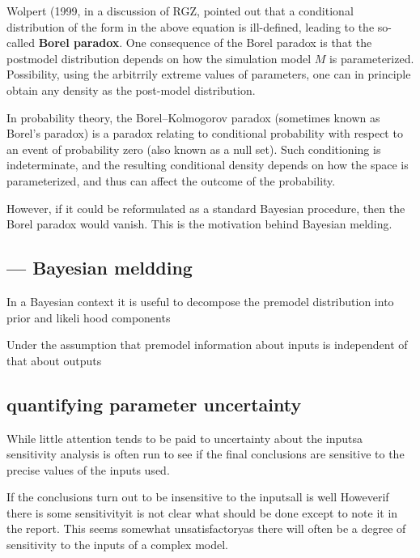 Wolpert (1999, in a discussion of RGZ, pointed out that a conditional
distribution of the form in the above equation is ill-defined, leading to the
so-called {\bf Borel paradox}.
One consequence of the Borel paradox is that the postmodel distribution depends
on how the simulation model $M$ is parameterized. Possibility, using the
arbitrrily extreme values of parameters, one can in principle obtain any density
as the post-model distribution.

\begin{mdframed}

In probability theory, the Borel–Kolmogorov paradox (sometimes known as Borel's
paradox) is a paradox relating to conditional probability with respect to an
event of probability zero (also known as a null set).
Such conditioning is indeterminate, and the resulting conditional density
depends on how the space is parameterized, and thus can affect the outcome of
the probability.

\end{mdframed}


However, if it could be reformulated as a standard Bayesian procedure, then the
Borel paradox would vanish. This is the motivation behind Bayesian melding.

\subsection{--- Bayesian meldding}

In a Bayesian context it is useful to decompose the premodel distribution into prior and likeli
hood components

Under the assumption that premodel information about inputs is independent
of that about outputs


\subsection{quantifying parameter uncertainty}

While little attention tends to be paid to uncertainty about the inputsa
sensitivity analysis is often run to see if the final conclusions are sensitive
to the precise values of the inputs used.

If the conclusions turn out to be insensitive to the inputsall is well
Howeverif there is some sensitivityit is not clear what should be done
except to note it in the report. This seems somewhat unsatisfactoryas there
will often be a degree of sensitivity to the inputs of a complex model.

